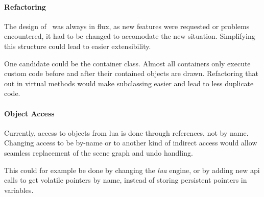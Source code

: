 \paragraph{Refactoring}
The design of \ER\ was always in flux, as new features were requested or problems encountered, it had to be changed to accomodate the new situation.
Simplifying this structure could lead to easier extensibility.

One candidate could be the container class.
Almost all containers only execute custom code before and after their contained objects are drawn.
Refactoring that out in virtual methods would make subclassing easier and lead to less duplicate code.

\paragraph{Object Access}
Currently, access to objects from lua is done through references, not by name.
Changing access to be by-name or to another kind of indirect access would allow seamless replacement of the scene graph and undo handling.

This could for example be done by changing the \textit{lua} engine, or by adding new api calls to get volatile pointers by name, instead of storing persistent pointers in variables.

